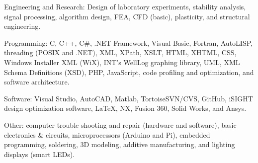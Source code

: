 \documentclass{leresume}
\begin{document}
    \begin{bulletedlist}
		
		\item Engineering and Research: Design of laboratory experiments,
                        stability analysis,
                        signal processing,
                        algorithm design,
                        FEA,
                        CFD (basic),
                        plasticity,
                        and structural engineering.

		\item Programming: C,
                        C++,
                        C\#,
                        .NET Framework,
                        Visual Basic,
                        Fortran,
                        AutoLISP,
                        threading (POSIX and .NET),
                        XML,
                        XPath,
                        XSLT,
                        HTML,
                        XHTML,
                        CSS,
                        Windows Installer XML (WiX),
                        INT's WellLog graphing library,
                        UML,
                        XML Schema Definitions (XSD),
                        PHP,
                        JavaScript,
                        code profiling and optimization,
                        and software architecture.

		\item Software: Visual Studio,
                        AutoCAD,
                        Matlab,
                        TortoiseSVN/CVS,
                        GitHub,
                        iSIGHT design optimization software,
                        LaTeX,
                        NX,
                        Fusion 360,
                        Solid Works,
                        and Ansys.

		\item Other: computer trouble shooting and repair (hardware and software),
                        basic electronics \& circuits,
                        microprocessors (Arduino and Pi),
                        embedded programming,
                        soldering,
                        3D modeling,
                        additive manufacturing,
                        and lighting displays (smart LEDs).

	\end{bulletedlist}
	

    
\end{document}

